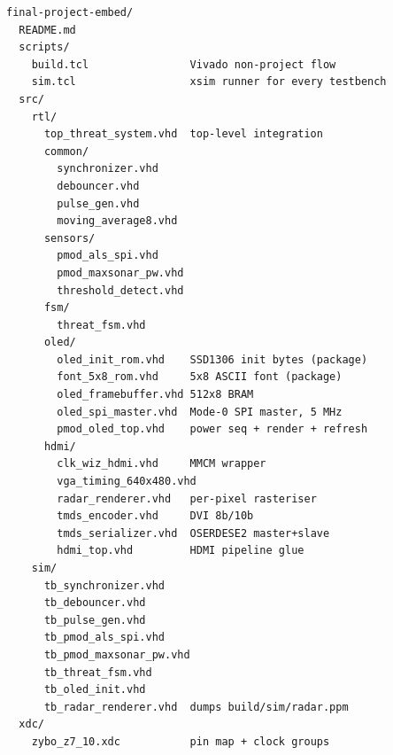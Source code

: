 \documentclass[11pt,a4paper]{article}
\begin{document}
\begin{verbatim}
final-project-embed/
  README.md
  scripts/
    build.tcl                Vivado non-project flow
    sim.tcl                  xsim runner for every testbench
  src/
    rtl/
      top_threat_system.vhd  top-level integration
      common/
        synchronizer.vhd
        debouncer.vhd
        pulse_gen.vhd
        moving_average8.vhd
      sensors/
        pmod_als_spi.vhd
        pmod_maxsonar_pw.vhd
        threshold_detect.vhd
      fsm/
        threat_fsm.vhd
      oled/
        oled_init_rom.vhd    SSD1306 init bytes (package)
        font_5x8_rom.vhd     5x8 ASCII font (package)
        oled_framebuffer.vhd 512x8 BRAM
        oled_spi_master.vhd  Mode-0 SPI master, 5 MHz
        pmod_oled_top.vhd    power seq + render + refresh
      hdmi/
        clk_wiz_hdmi.vhd     MMCM wrapper
        vga_timing_640x480.vhd
        radar_renderer.vhd   per-pixel rasteriser
        tmds_encoder.vhd     DVI 8b/10b
        tmds_serializer.vhd  OSERDESE2 master+slave
        hdmi_top.vhd         HDMI pipeline glue
    sim/
      tb_synchronizer.vhd
      tb_debouncer.vhd
      tb_pulse_gen.vhd
      tb_pmod_als_spi.vhd
      tb_pmod_maxsonar_pw.vhd
      tb_threat_fsm.vhd
      tb_oled_init.vhd
      tb_radar_renderer.vhd  dumps build/sim/radar.ppm
  xdc/
    zybo_z7_10.xdc           pin map + clock groups
\end{verbatim}
\end{document}
